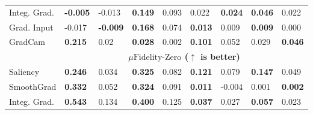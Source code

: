 \begin{table}[]
\begin{tabular}{lllllllll}
\multicolumn{1}{l|}{Integ. Grad.}                                  & \textbf{-0.005}           & \multicolumn{1}{l|}{-0.013}          & \textbf{0.149}            & \multicolumn{1}{l|}{0.093}   &                   0.022        & \multicolumn{1}{l|}{\textbf{0.024}}       &          \textbf{0.046   }                     &        0.022                    \\
\multicolumn{1}{l|}{Grad. Input}                                  & -0.017                    & \multicolumn{1}{l|}{\textbf{-0.009}} & \textbf{0.168}            & \multicolumn{1}{l|}{0.074}   &                   \textbf{0.013}       & \multicolumn{1}{l|}{0.009}       &      \textbf{0.009 }        &           0.000                 \\
\multicolumn{1}{l|}{GradCam}                                  & \textbf{0.215}            & \multicolumn{1}{l|}{0.02}            & \textbf{0.028}            & \multicolumn{1}{l|}{0.002}   &                    \textbf{0.101}       & \multicolumn{1}{l|}{0.052}       &          0.029                 &               \textbf{0.046 }            \\ \hline
\rowcolor[HTML]{EFEFEF} 
\multicolumn{1}{l|}{\cellcolor[HTML]{EFEFEF}Attribution} & \multicolumn{8}{c}{\cellcolor[HTML]{EFEFEF}\textbf{$\mu\text{Fidelity-Zero}$  ($\uparrow$ is better)}}                                                                                                                                         \\ \hline
\multicolumn{1}{l|}{Saliency}                            & \textbf{0.246}            & \multicolumn{1}{l|}{0.034}           & \textbf{0.325}            & \multicolumn{1}{l|}{0.082}   & \textbf{0.121}            & \multicolumn{1}{l|}{0.079}  & \textbf{0.147}            & 0.049                      \\
\multicolumn{1}{l|}{SmoothGrad}                          & \textbf{0.332}            & \multicolumn{1}{l|}{0.052}           & \textbf{0.324}            & \multicolumn{1}{l|}{0.091}   & \textbf{0.011}            & \multicolumn{1}{l|}{-0.004} & 0.001                     & \textbf{0.002}             \\
\multicolumn{1}{l|}{Integ. Grad.}                                  & \textbf{0.543}            & \multicolumn{1}{l|}{0.134}           & \textbf{0.400}            & \multicolumn{1}{l|}{0.125}   & \textbf{0.037}            & \multicolumn{1}{l|}{0.027}  & \textbf{0.057}            & 0.023                      \\

\end{tabular}
\end{table}
